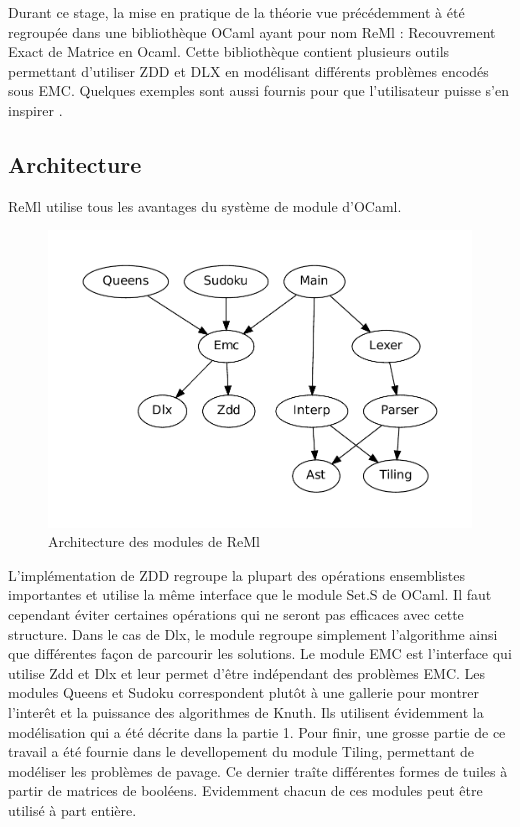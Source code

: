 \documentclass[a4paper]{article}
\begin{document}
Durant ce stage, la mise en pratique de la théorie vue précédemment à été 
regroupée dans une 
bibliothèque OCaml ayant pour nom ReMl : Recouvrement Exact de Matrice en Ocaml.
Cette bibliothèque contient plusieurs outils permettant d'utiliser ZDD et DLX 
en modélisant différents problèmes encodés sous EMC.
Quelques exemples sont aussi fournis pour que l'utilisateur puisse s'en inspirer
.

\subsection{Architecture}

ReMl utilise tous les avantages du système de module d'OCaml. 

\begin{figure}[htp]
\begin{center}
\includegraphics[scale=0.5]{../imports/archi.pdf}
\end{center}
\caption{\label{fig:archi} Architecture des modules de ReMl}
\end{figure}

L'implémentation de ZDD regroupe la plupart des opérations ensemblistes 
importantes et utilise la même interface que le module Set.S de OCaml. Il faut
cependant éviter certaines opérations qui ne seront pas efficaces avec cette 
structure. 
Dans le cas de Dlx, le module regroupe simplement l'algorithme ainsi que 
différentes façon de parcourir les solutions. Le module EMC est l'interface qui
utilise Zdd et Dlx et leur permet d'être indépendant des problèmes EMC.
Les modules Queens et Sudoku correspondent plutôt à une gallerie pour montrer
l'interêt et la puissance des algorithmes de Knuth. Ils utilisent évidemment la 
modélisation qui a été décrite dans la partie 1. 
Pour finir, une grosse partie de ce travail a été fournie dans le devellopement
du module Tiling, permettant de modéliser les problèmes de pavage. Ce dernier
traîte différentes formes de tuiles à partir de matrices de booléens. 
Evidemment chacun de ces modules peut être utilisé à part entière.
\end{document}
